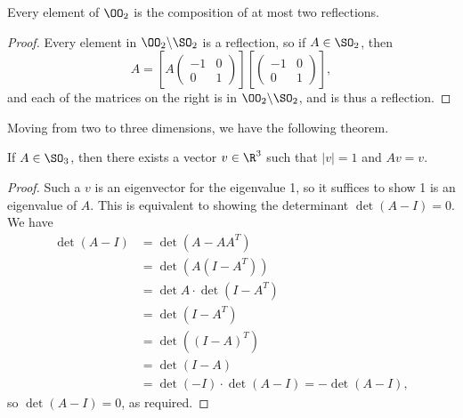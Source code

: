 \documentclass[a4paper]{scrartcl}
\begin{document}
\begin{corollary}
	Every element of $\OO_2$ is the composition of at most two reflections.
\end{corollary}
\begin{proof}
	Every element in $\OO_2 \backslash \SO_2$ is a reflection, so if $A \in \SO_2$, then
	$$
	A =\left[ A \begin{pmatrix}
		-1 & 0 \\ 0 & 1
	\end{pmatrix}\right]\left[\begin{pmatrix}
		-1 & 0 \\ 0 & 1
	\end{pmatrix}\right],
	$$
	and each of the matrices on the right is in $\OO_2 \backslash \SO_2$, and is thus a reflection.
\end{proof}

Moving from two to three dimensions, we have the following theorem.
\begin{theorem}
	If $A \in \SO_3$, then there exists a vector $v \in \R^3$ such that $|v| = 1$ and $Av = v$.
\end{theorem}
\begin{proof}
	Such a $v$ is an eigenvector for the eigenvalue 1, so it suffices to show 1 is an eigenvalue of $A$. This is equivalent to showing the determinant $\det(A - I) = 0$. We have
	{\allowdisplaybreaks
	\begin{align*}
\det(A - I) &= \det(A - AA^T) \\
			&= \det(A(I - A^T)) \\
			&= \det A \cdot \det (I - A^T) \\
			&= \det(I - A^T)\\
			&= \det((I - A)^T)\\
			&= \det(I - A) \\
			&= \det(-I) \cdot \det(A - I) = -\det(A - I),
	\end{align*}}
	so $\det(A - I) = 0$, as required.
\end{proof}
\end{document}
